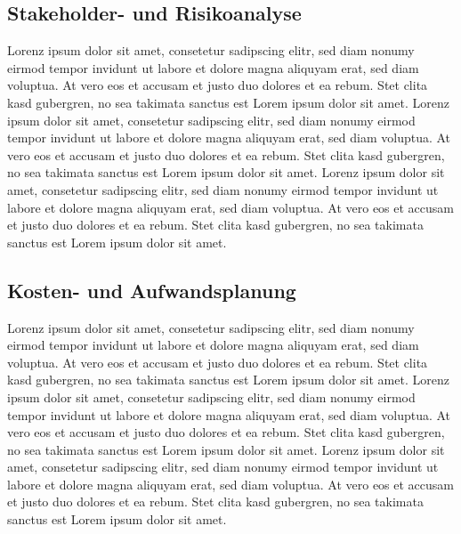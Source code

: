 \subsection{Stakeholder- und Risikoanalyse}\label{subsec:Stakeholder-Risikoanalyse}
Lorenz ipsum dolor sit amet, consetetur sadipscing elitr, sed diam nonumy eirmod tempor invidunt ut labore et dolore magna aliquyam erat, sed diam voluptua.
At vero eos et accusam et justo duo dolores et ea rebum.
Stet clita kasd gubergren, no sea takimata sanctus est Lorem ipsum dolor sit amet.
Lorenz ipsum dolor sit amet, consetetur sadipscing elitr, sed diam nonumy eirmod tempor invidunt ut labore et dolore magna aliquyam erat, sed diam voluptua.
At vero eos et accusam et justo duo dolores et ea rebum.
Stet clita kasd gubergren, no sea takimata sanctus est Lorem ipsum dolor sit amet.
Lorenz ipsum dolor sit amet, consetetur sadipscing elitr, sed diam nonumy eirmod tempor invidunt ut labore et dolore magna aliquyam erat, sed diam voluptua.
At vero eos et accusam et justo duo dolores et ea rebum.
Stet clita kasd gubergren, no sea takimata sanctus est Lorem ipsum dolor sit amet.

\subsection{Kosten- und Aufwandsplanung}\label{subsec:Kosten-Aufwandsplanung}
Lorenz ipsum dolor sit amet, consetetur sadipscing elitr, sed diam nonumy eirmod tempor invidunt ut labore et dolore magna aliquyam erat, sed diam voluptua.
At vero eos et accusam et justo duo dolores et ea rebum.
Stet clita kasd gubergren, no sea takimata sanctus est Lorem ipsum dolor sit amet.
Lorenz ipsum dolor sit amet, consetetur sadipscing elitr, sed diam nonumy eirmod tempor invidunt ut labore et dolore magna aliquyam erat, sed diam voluptua.
At vero eos et accusam et justo duo dolores et ea rebum.
Stet clita kasd gubergren, no sea takimata sanctus est Lorem ipsum dolor sit amet.
Lorenz ipsum dolor sit amet, consetetur sadipscing elitr, sed diam nonumy eirmod tempor invidunt ut labore et dolore magna aliquyam erat, sed diam voluptua.
At vero eos et accusam et justo duo dolores et ea rebum.
Stet clita kasd gubergren, no sea takimata sanctus est Lorem ipsum dolor sit amet.


